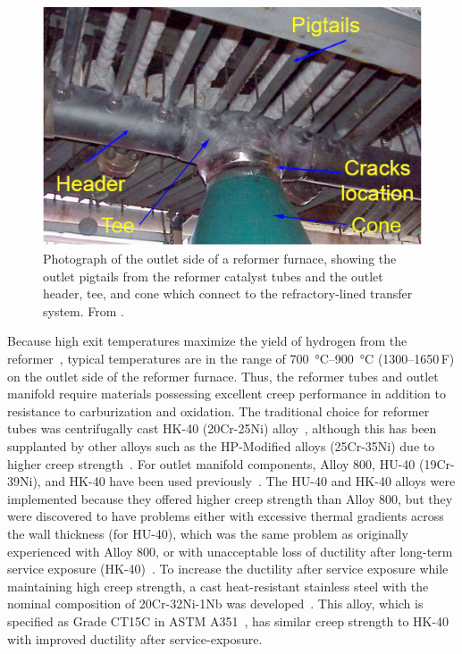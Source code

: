 \begin{figure}[h]
\centering
\includegraphics{figures/reformer-tee-cone}
\caption{Photograph of the outlet side of a reformer furnace, showing the outlet pigtails from the reformer catalyst tubes and the outlet header, tee, and cone which connect to the refractory-lined transfer system.  From \citet{penso_repair_2006}.}
\label{fig:reformer-tee-cone}
\end{figure}

Because high exit temperatures maximize the yield of hydrogen from the reformer~\cite{haussinger_hydrogen_2000}, typical temperatures are in the range of \SIrange[range-phrase=--]{700}{900}{\degreeCelsius} (\numrange[range-phrase=--]{1300}{1650}\,\textdegree{}F) on the outlet side of the reformer furnace. Thus, the reformer tubes and outlet manifold require materials possessing excellent creep performance in addition to resistance to carburization and oxidation. The traditional choice for reformer tubes was centrifugally cast HK-40 (20Cr-25Ni) alloy~\cite{rostrup-nielsen_catalytic_1984}, although this has been supplanted by other alloys such as the HP-Modified alloys (25Cr-35Ni) due to higher creep strength~\cite{schillmoller_hp-modified_1992}. For outlet manifold components, Alloy 800, HU-40 (19Cr-39Ni), and HK-40 have been used previously~\cite{shibasaki_experience_1994}. The HU-40 and HK-40 alloys were implemented because they offered higher creep strength than Alloy 800, but they were discovered to have problems either with excessive thermal gradients across the wall thickness (for HU-40), which was the same problem as originally experienced with Alloy 800, or with unacceptable loss of ductility after long-term service exposure (HK-40)~\cite{shibasaki_experience_1994,collins_effect_1980}. To increase the ductility after service exposure while maintaining high creep strength, a cast heat-resistant stainless steel with the nominal composition of 20Cr-32Ni-1Nb was developed~\cite{collins_effect_1980}. This alloy, which is specified as Grade CT15C in ASTM A351~\cite{astm_a351_2010}, has similar creep strength to HK-40~\cite{shibasaki_experience_1994} with improved ductility after service-exposure. 

